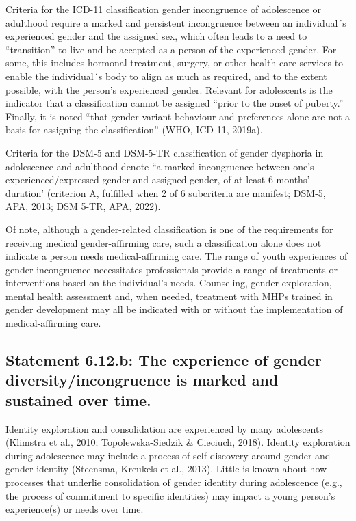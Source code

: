 \documentclass[
]{book}
\begin{document}
Criteria for the ICD-11 classification gender
incongruence of adolescence or adulthood require
a marked and persistent incongruence between an
individual´s experienced gender and the assigned
sex, which often leads to a need to ``transition'' to
live and be accepted as a person of the experienced gender. For some, this includes hormonal
treatment, surgery, or other health care services
to enable the individual´s body to align as much
as required, and to the extent possible, with the
person's experienced gender. Relevant for adolescents is the indicator that a classification cannot
be assigned ``prior to the onset of puberty.'' Finally,
it is noted ``that gender variant behaviour and
preferences alone are not a basis for assigning the
classification'' (WHO, ICD-11, 2019a).

Criteria for the DSM-5 and DSM-5-TR classification of gender dysphoria in adolescence and
adulthood denote ``a marked incongruence between
one's experienced/expressed gender and assigned
gender, of at least 6 months' duration' (criterion
A, fulfilled when 2 of 6 subcriteria are manifest;
DSM-5, APA, 2013; DSM 5-TR, APA, 2022).

Of note, although a gender-related classification is one of the requirements for receiving
medical gender-affirming care, such a classification alone does not indicate a person needs
medical-affirming care. The range of youth experiences of gender incongruence necessitates professionals provide a range of treatments or
interventions based on the individual's needs.
Counseling, gender exploration, mental health
assessment and, when needed, treatment with
MHPs trained in gender development may all be
indicated with or without the implementation of
medical-affirming care.

\hypertarget{statement-6.12.b-the-experience-of-gender-diversityincongruence-is-marked-and-sustained-over-time.}{%
\subsection*{Statement 6.12.b: The experience of gender diversity/incongruence is marked and sustained over time.}\label{statement-6.12.b-the-experience-of-gender-diversityincongruence-is-marked-and-sustained-over-time.}}

Identity exploration and consolidation are
experienced by many adolescents (Klimstra et al.,
2010; Topolewska-Siedzik \& Cieciuch, 2018).
Identity exploration during adolescence may
include a process of self-discovery around gender
and gender identity (Steensma, Kreukels et al.,
2013). Little is known about how processes that
underlie consolidation of gender identity during
adolescence (e.g., the process of commitment to
specific identities) may impact a young person's
experience(s) or needs over time.
\end{document}
